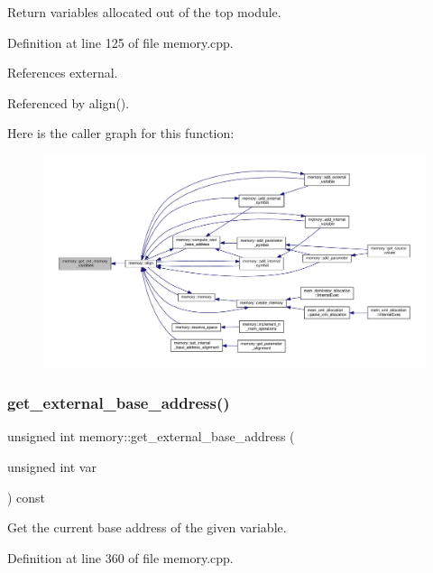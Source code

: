 Return variables allocated out of the top module. 



Definition at line 125 of file memory.\+cpp.



References external.



Referenced by align().

Here is the caller graph for this function\+:
\nopagebreak
\begin{figure}[H]
\begin{center}
\leavevmode
\includegraphics[width=350pt]{d8/d99/classmemory_a59407bf67cc11931fc505d7fc9e86898_icgraph}
\end{center}
\end{figure}
\mbox{\label{classmemory_a32fccfbb1ec87572fffb59d3a8a93548}} 
\subsubsection{\texorpdfstring{get\+\_\+external\+\_\+base\+\_\+address()}{get\_external\_base\_address()}}
{\footnotesize\ttfamily unsigned int memory\+::get\+\_\+external\+\_\+base\+\_\+address (\begin{DoxyParamCaption}\item[{unsigned int}]{var }\end{DoxyParamCaption}) const}



Get the current base address of the given variable. 



Definition at line 360 of file memory.\+cpp.



